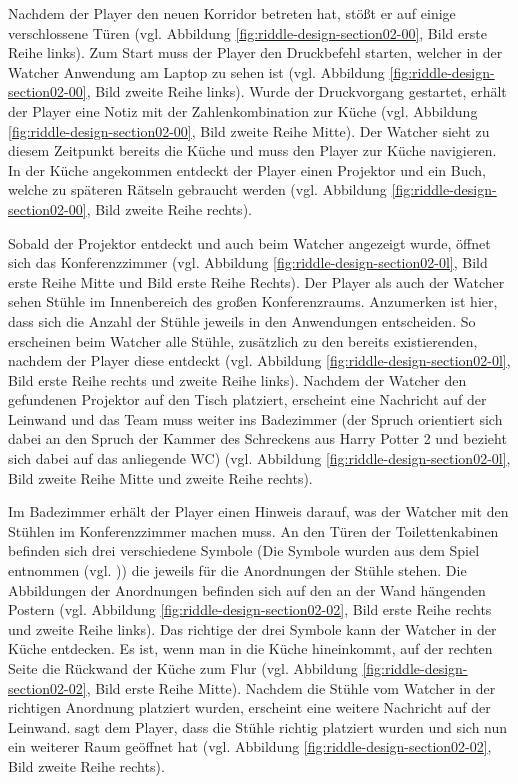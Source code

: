 Nachdem der Player den neuen Korridor betreten hat, stößt er auf einige verschlossene Türen (vgl. Abbildung \ref{fig:riddle-design-section02-00}, Bild erste Reihe links). Zum Start muss der Player den Druckbefehl starten, welcher in der Watcher Anwendung am Laptop zu sehen ist (vgl. Abbildung \ref{fig:riddle-design-section02-00}, Bild zweite Reihe links). Wurde der Druckvorgang gestartet, erhält der Player eine Notiz mit der Zahlenkombination zur Küche (vgl. Abbildung \ref{fig:riddle-design-section02-00}, Bild zweite Reihe Mitte). Der Watcher sieht zu diesem Zeitpunkt bereits die Küche und muss den Player zur Küche navigieren. In der Küche angekommen entdeckt der Player einen Projektor und ein Buch, welche zu späteren Rätseln gebraucht werden (vgl. Abbildung \ref{fig:riddle-design-section02-00}, Bild zweite Reihe rechts). 

Sobald der Projektor entdeckt und auch beim Watcher angezeigt wurde, öffnet sich das Konferenzzimmer (vgl. Abbildung \ref{fig:riddle-design-section02-0l}, Bild erste Reihe Mitte und Bild erste Reihe Rechts). Der Player als auch der Watcher sehen Stühle im Innenbereich des großen Konferenzraums. Anzumerken ist hier, dass sich die Anzahl der Stühle jeweils in den Anwendungen entscheiden. So erscheinen beim Watcher alle Stühle, zusätzlich zu den bereits existierenden, nachdem der Player diese entdeckt (vgl. Abbildung \ref{fig:riddle-design-section02-0l}, Bild erste Reihe rechts und zweite Reihe links). Nachdem der Watcher den gefundenen Projektor auf den Tisch platziert, erscheint eine Nachricht auf der Leinwand und das Team muss weiter ins Badezimmer (der Spruch  orientiert sich dabei an den Spruch der Kammer des Schreckens aus Harry Potter 2 und bezieht sich dabei auf das anliegende WC) (vgl. Abbildung \ref{fig:riddle-design-section02-0l}, Bild zweite Reihe Mitte und zweite Reihe rechts).

Im Badezimmer erhält der Player einen Hinweis darauf, was der Watcher mit den Stühlen im Konferenzzimmer machen muss. An den Türen der Toilettenkabinen befinden sich drei verschiedene Symbole (Die Symbole wurden aus dem Spiel  entnommen (vgl. \cite{noauthor_we_nodate})) die jeweils für die Anordnungen der Stühle stehen. Die Abbildungen der Anordnungen befinden sich auf den an der Wand hängenden Postern (vgl. Abbildung \ref{fig:riddle-design-section02-02}, Bild erste Reihe rechts und zweite Reihe links). Das richtige der drei Symbole kann der Watcher in der Küche entdecken. Es ist, wenn man in die Küche hineinkommt, auf der rechten Seite die Rückwand der Küche zum Flur (vgl. Abbildung \ref{fig:riddle-design-section02-02}, Bild erste Reihe Mitte). Nachdem die Stühle vom Watcher in der richtigen Anordnung platziert wurden, erscheint eine weitere Nachricht auf der Leinwand.  sagt dem Player, dass die Stühle richtig platziert wurden und sich nun ein weiterer Raum geöffnet hat (vgl. Abbildung \ref{fig:riddle-design-section02-02}, Bild zweite Reihe rechts).

